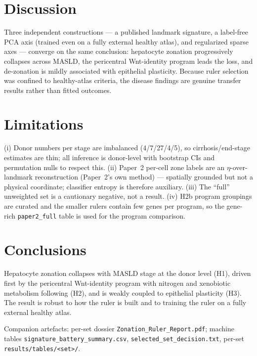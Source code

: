 \documentclass[11pt]{article}
\begin{document}
\section{Discussion}
Three independent constructions --- a published landmark signature, a label-free PCA axis (trained
even on a fully external healthy atlas), and regularized sparse axes --- converge on the same
conclusion: hepatocyte zonation progressively collapses across MASLD, the pericentral Wnt-identity
program leads the loss, and de-zonation is mildly associated with epithelial plasticity. Because
ruler selection was confined to healthy-atlas criteria, the disease findings are genuine transfer
results rather than fitted outcomes.

\section{Limitations}
(i) Donor numbers per stage are imbalanced (4/7/27/4/5), so cirrhosis/end-stage estimates are thin;
all inference is donor-level with bootstrap CIs and permutation nulls to respect this. (ii) Paper~2
per-cell zone labels are an $\eta$-over-landmark reconstruction (Paper~2's own method) --- spatially
grounded but not a physical coordinate; classifier entropy is therefore auxiliary. (iii) The
``full'' unweighted set is a cautionary negative, not a result. (iv) H2b program groupings are
curated and the smaller rulers contain few genes per program, so the gene-rich \texttt{paper2\_full}
table is used for the program comparison.

\section{Conclusions}
Hepatocyte zonation collapses with MASLD stage at the donor level (H1), driven first by the
pericentral Wnt-identity program with nitrogen and xenobiotic metabolism following (H2), and is
weakly coupled to epithelial plasticity (H3). The result is robust to how the ruler is built and to
training the ruler on a fully external healthy atlas.

\vspace{1em}\footnotesize Companion artefacts: per-set dossier \texttt{Zonation\_Ruler\_Report.pdf};
machine tables \texttt{signature\_battery\_summary.csv}, \texttt{selected\_set\_decision.txt},
per-set \texttt{results/tables/<set>/}.
\end{document}
